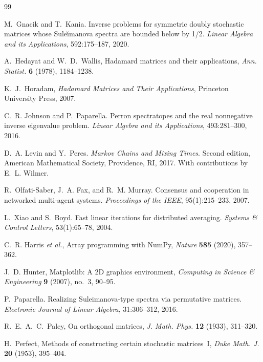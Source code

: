 \documentclass[12pt,fleqn]{amsart}
\theoremstyle{definition}
\theoremstyle{remark}
\newcommand{\1}{\mathbf{1}}
\begin{document}
\newpage

\begin{thebibliography}{99}

M.~Gnacik and T.~Kania.
\newblock Inverse problems for symmetric doubly stochastic matrices whose {Sule{\u{\i}}manova} spectra are bounded below by 1/2.
\newblock \emph{Linear Algebra and its Applications}, 592:175--187, 2020.

A.~Hedayat and W.~D.~Wallis,
\newblock Hadamard matrices and their applications,
\emph{Ann. Statist.} \textbf{6} (1978), 1184--1238.

K.~J.~Horadam,
\newblock \emph{Hadamard Matrices and Their Applications}, Princeton University Press, 2007.

C.~R. Johnson and P.~Paparella.
\newblock Perron spectratopes and the real nonnegative inverse eigenvalue problem.
\newblock \emph{Linear Algebra and its Applications}, 493:281--300, 2016.

D.~A. Levin and Y.~Peres.
\newblock \emph{Markov Chains and Mixing Times}.
\newblock Second edition, American Mathematical Society, Providence, RI, 2017. With contributions by E.~L. Wilmer.

R.~Olfati-Saber, J.~A. Fax, and R.~M. Murray.
\newblock Consensus and cooperation in networked multi-agent systems.
\newblock \emph{Proceedings of the IEEE}, 95(1):215--233, 2007.

L.~Xiao and S.~Boyd.
\newblock Fast linear iterations for distributed averaging.
\newblock \emph{Systems \& Control Letters}, 53(1):65--78, 2004.

C.~R. Harris \emph{et al.}, 
\newblock Array programming with NumPy, 
\emph{Nature} \textbf{585} (2020), 357--362.

J.~D. Hunter, 
\newblock Matplotlib: A 2D graphics environment, 
\emph{Computing in Science \& Engineering} \textbf{9} (2007), no.~3, 90--95.

P.~Paparella.
\newblock Realizing {Suleimanova}-type spectra via permutative matrices.
\newblock \emph{Electronic Journal of Linear Algebra}, 31:306--312, 2016.

R.~E.~A.~C.~Paley,
\newblock On orthogonal matrices, \emph{J. Math. Phys.} \textbf{12} (1933), 311--320.

H.~Perfect,
\newblock Methods of constructing certain stochastic matrices~I,
\emph{Duke Math. J.} \textbf{20} (1953), 395--404.


\end{thebibliography}
\end{document}
